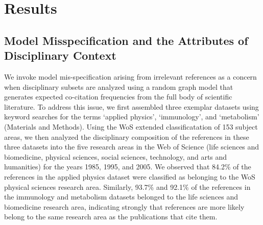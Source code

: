 \documentclass[NETN]{stjour}
\begin{document}
\section{Results}

\subsection{Model Misspecification and the Attributes of Disciplinary Context} We invoke model mis-specification arising from irrelevant references as a concern when disciplinary subsets are analyzed using a random graph model that generates expected co-citation frequencies from the full body of scientific literature. To address this issue, we first assembled three exemplar datasets using keyword searches for the terms `applied physics', `immunology', and `metabolism' (Materials and Methods). Using the WoS extended classificatation of 153 subject areas, we then analyzed the disciplinary composition of the references in these three datasets into the five research areas in the Web of Science (life sciences and biomedicine, physical sciences, social sciences, technology, and arts and humanities) for the years 1985, 1995, and 2005. We observed that 84.2\% of the references in the applied physics dataset were classified as belonging to the WoS physical sciences research area. Similarly, 93.7\% and 92.1\% of the references in the immunology and metabolism datasets belonged to the life sciences and biomedicine research area, indicating strongly that references are more likely belong to the same research area as the publications that cite them.
\end{document}
